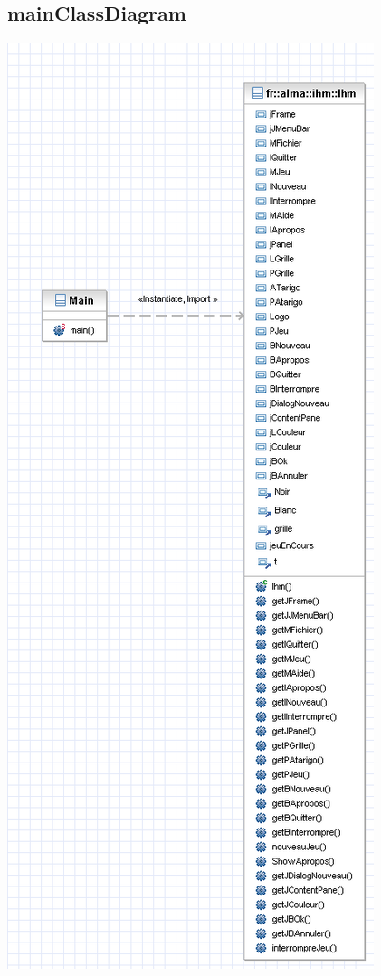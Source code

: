 \documentclass{report}
\begin{document}
\subsection*{mainClassDiagram}
\begin{center}
\includegraphics[scale=0.50]{images/fralmamainClassDiagram}
\end{center}
\end{document}
